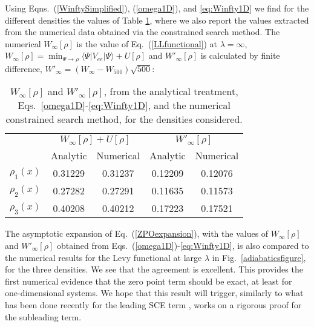 \documentclass[aps,pra,twocolumn,superscriptaddress]{revtex4}
\begin{document}
Using Eqns.~(\ref{WinftySimplified}), (\ref{omega1D}), and \eqref{eq:Winfty1D} we find for the different densities the values of Table \ref{tab:table}, where we also report the values extracted from the numerical data obtained via the constrained search method. 
The numerical $W_\infty[\rho]$ is the value of Eq.~(\ref{LLfunctional}) at $\lambda=\infty$,
$W_\infty[\rho]=\min_{\Psi\rightarrow\rho}\langle\Psi|V_{ee}|\Psi\rangle + U[\rho]$ and $W'_\infty[\rho]$ is calculated by finite difference, $W'_\infty = (W_\infty-W_{500})\sqrt{500}$:
\begin{table}[H]
\centering
\begin{tabular}{c | c | c | c | c }

     & \multicolumn{2}{|c|}{$W_{\infty}[\rho]+U[\rho]$} & \multicolumn{2}{|c}{$W'_{\infty}[\rho]$}\\ 
\cline{2-5}
     & Analytic & Numerical & Analytic  & Numerical \\
     \hline
   $\rho_1(x)$ & 0.31229 & 0.31237 & 0.12209 & 0.12076\\ 
   $\rho_2(x)$ & 0.27282 & 0.27291 & 0.11635 & 0.11573\\ 
   $\rho_3(x)$ & 0.40208 & 0.40212 & 0.17223 & 0.17521 \\ 
   \hline
    \end{tabular}
    \caption{$W_{\infty}[\rho]$ and $W'_{\infty}[\rho]$, from the analytical treatment, Eqs.~\eqref{omega1D}-\eqref{eq:Winfty1D}, and the numerical constrained search method, for the densities considered.} \label{tab:table}
\end{table}
The asymptotic expansion of Eq.~(\ref{ZPOexpansion}), with the values of $W_\infty[\rho]$ and $W'_\infty[\rho]$ obtained from Eqs.~(\ref{omega1D})-\eqref{eq:Winfty1D}, is also compared to the numerical results for the Levy functional at large $\lambda$ in Fig.~\ref{adiabaticsfigure}, for the three densities. We see that the agreement is excellent. This provides the first numerical evidence that the zero point term should be exact, at least for one-dimensional systems. We hope that this result will trigger, similarly to what has been done recently for the leading SCE term \cite{Lew-arxiv-17,CotFriKlu-arxiv-17}, works on a rigorous proof for the subleading term.
\end{document}
